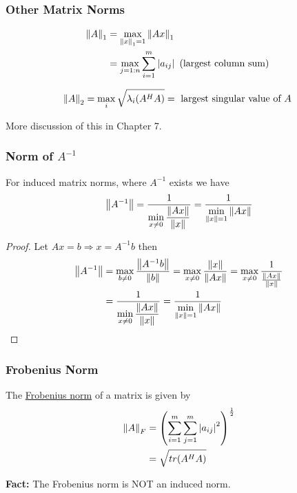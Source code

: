 \documentclass{beamer}
\begin{document}
\begin{frame}\frametitle{Other Matrix Norms}
	\begin{lemma}
		\begin{align*}
			\left\|A\right\|_1 &= \max_{\left\|x\right\|_1 = 1} \left\|Ax\right\|_1 \\
				 	   &= \max_{j=1:n} \sum_{i=1}^m \left|a_{ij}\right| \text{ (largest column sum) }
		\end{align*}
	\end{lemma}
	
	\vfill
	
	\begin{lemma}
		\[ 
		\left\|A\right\|_2 = \max_i \sqrt{\lambda_i(A^HA)} = \text{ largest singular value of $A$ }
		 \]
	\end{lemma}
	More discussion of this in Chapter 7.
\end{frame}

\begin{frame}\frametitle{Norm of $A^{-1}$}
	\begin{theorem}
	For induced matrix norms, where $A^{-1}$ exists we have 
	\[ 
	\left\|A^{-1} \right\| = \frac{1}{\displaystyle\min_{x \neq 0}\frac{\left\|Ax \right\|}{\left\|x \right\|}} = \frac{1}{\displaystyle\min_{\left\|x \right\|=1}\left\|Ax \right\|}
	\]
	\end{theorem}
	
	\begin{proof}
		Let $Ax = b \Rightarrow x = A^{-1}b $ then
		\begin{align*}
		\left\|A^{-1} \right\| &= \max_{b \neq 0} \frac{\left\|A^{-1}b \right\|}{\left\|b \right\|} = \max_{x \neq 0}\frac{\left\|x \right\|}{\left\|Ax \right\|} = \max_{x \neq 0}\frac{1}{\frac{\left\|Ax \right\|}{\left\|x \right\|}}\\
		&= \frac{1}{\displaystyle\min_{x \neq 0} \frac{\left\|Ax \right\|}{\left\|x \right\|}} = \frac{1}{\displaystyle\min_{\left\|x\right\|=1} \left\|Ax \right\|}
		\end{align*}	
	\end{proof}
\end{frame}

\begin{frame}\frametitle{Frobenius Norm}
	\begin{definition} The \underline{Frobenius norm} of a matrix is given by
		\begin{align*}
			\left\|A \right\|_F &= \left( \sum_{i=1}^{m} \sum_{j=1}^{m} \left|a_{ij}\right|^2 \right)^{\frac{1}{2}} \\
				&= \sqrt{ tr(A^HA) }
		\end{align*}
	\end{definition}
	
	{\bf\color{darkolivegreen} Fact:}  The Frobenius norm is NOT an induced norm.  
\end{frame}
\end{document}

